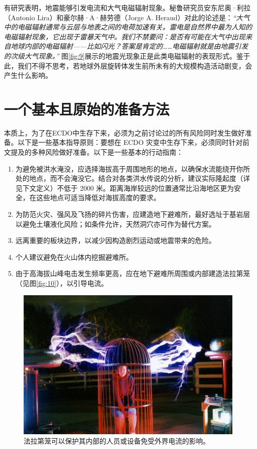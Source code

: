 \documentclass[10pt,twocolumn,letterpaper]{article}
\begin{document}
有研究表明，地震能够引发电流和大气电磁辐射现象\cite{49,50}。秘鲁研究员安东尼奥·利拉（Antonio Lira）和豪尔赫·A·赫劳德（Jorge A. Heraud）对此的论述是：\textit{“大气中的电磁辐射通常与云层与地表之间的电荷加速有关。雷电是自然界中最为人知的电磁辐射现象，它出现于雷暴天气中。我们不禁要问：是否有可能在大气中出现来自地球内部的电磁辐射——比如闪光？答案是肯定的……电磁辐射就是由地震引发的次级大气现象。”} \cite{50}图\ref{fig:9}展示的地震光现象正是此类电磁辐射的表现形式。鉴于此，我们不得不思考，若地球外层旋转体发生前所未有的大规模构造活动剧变，会产生什么影响。
\section{一个基本且原始的准备方法}

本质上，为了在ECDO中生存下来，必须为之前讨论过的所有风险同时发生做好准备。以下是一些基本指导原则：要想在 ECDO 灾变中生存下来，必须同时针对前文提及的多种风险做好准备。以下是一些基本的行动指南：

\begin{flushleft}
\begin{enumerate}
    \item 为避免被洪水淹没，应选择海拔高于周围地形的地点，以确保水流能绕开你所处的地点，而不会淹没它。结合对各类洪水传说的分析，建议实际隆起度（详见下文定义）不低于 2000 米。距离海岸较远的位置通常比沿海地区更为安全，在这些地点可适当降低对海拔高度的要求。
    \item 为防范火灾、强风及飞扬的碎片伤害，应建造地下避难所，最好选址于基岩层以避免土壤液化风险；如条件允许，天然洞穴亦可作为替代方案。
    \item 远离重要的板块边界，以减少因构造剧烈运动或地震带来的危险。
    \item 个人建议避免在火山体内挖掘避难所。
    \item 由于高海拔山峰电击发生频率更高，应在地下避难所周围或内部建造法拉第笼（见图\ref{fig:10}），以引导电流。
\end{enumerate}
\end{flushleft}

\begin{figure}[t]
\begin{center}
   \includegraphics[width=1\linewidth]{faraday.jpg}
\end{center}
   \caption{法拉第笼可以保护其内部的人员或设备免受外界电流的影响\cite{54}。}
\label{fig:10}
\label{fig:onecol}
\end{figure}
\end{document}
